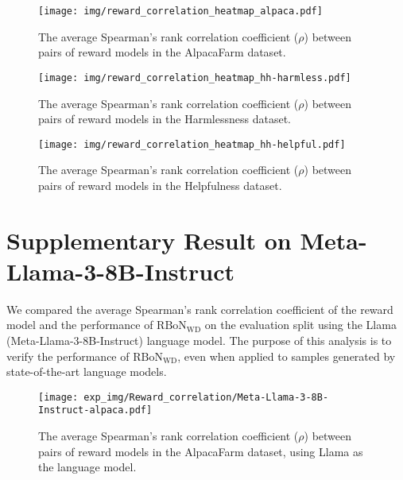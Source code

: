 \begin{figure}[htbp]
    \centering
    \texttt{[image: img/reward\_correlation\_heatmap\_alpaca.pdf]}
    \caption{
    The average Spearman's rank correlation coefficient ($\rho$) between pairs of reward models in the AlpacaFarm dataset.
    }
    \label{fig:rec_a}
\end{figure}

\begin{figure}[htbp]
    \centering
    \texttt{[image: img/reward\_correlation\_heatmap\_hh-harmless.pdf]}
    \caption{
    The average Spearman's rank correlation coefficient ($\rho$) between pairs of reward models in the Harmlessness dataset.
    }
    \label{fig:rec_ha}
\end{figure}

\begin{figure}[htbp]
    \centering
    \texttt{[image: img/reward\_correlation\_heatmap\_hh-helpful.pdf]}
    \caption{
    The average Spearman's rank correlation coefficient ($\rho$) between pairs of reward models in the Helpfulness dataset.
    }
    \label{fig:rec_he}
\end{figure}
\newpage
\section{Supplementary Result on Meta-Llama-3-8B-Instruct \citep{dubey2024llama}}
We compared the average Spearman's rank correlation coefficient of the reward model and the performance of $\mathrm{{RBoN}}_{{\mathrm{{WD}}}}$ on the evaluation split using the Llama (Meta-Llama-3-8B-Instruct) language model.
The purpose of this analysis is to verify the performance of $\mathrm{{RBoN}}_{{\mathrm{{WD}}}}$, even when applied to samples generated by state-of-the-art language models.


\begin{figure}[htbp]
    \centering
    \texttt{[image: exp\_img/Reward\_correlation/Meta-Llama-3-8B-Instruct-alpaca.pdf]}
    \caption{
    The average Spearman's rank correlation coefficient ($\rho$) between pairs of reward models in the AlpacaFarm dataset, using Llama as the language model.
    }
    \label{fig:rec_meta_a}
\end{figure}

